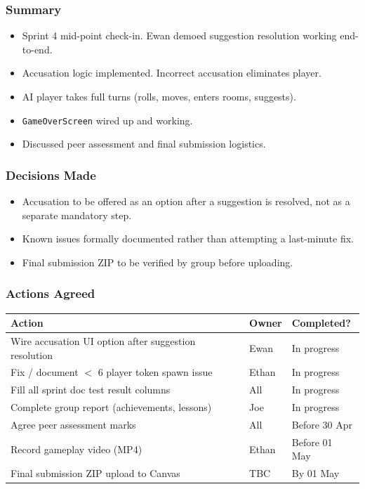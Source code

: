 \subsubsection*{Summary}
\begin{itemize}
    \item Sprint 4 mid-point check-in. Ewan demoed suggestion resolution working end-to-end.
    \item Accusation logic implemented. Incorrect accusation eliminates player.
    \item AI player takes full turns (rolls, moves, enters rooms, suggests).
    \item \texttt{GameOverScreen} wired up and working.
    \item Discussed peer assessment and final submission logistics.
\end{itemize}

\subsubsection*{Decisions Made}
\begin{itemize}
    \item Accusation to be offered as an option after a suggestion is resolved, not as a separate mandatory step.
    \item Known issues formally documented rather than attempting a last-minute fix.
    \item Final submission ZIP to be verified by group before uploading.
\end{itemize}

\subsubsection*{Actions Agreed}
\begin{table}[H]
\centering
\begin{tabular}{|p{8cm}|l|l|}
\hline
\textbf{Action} & \textbf{Owner} & \textbf{Completed?} \\ \hline
Wire accusation UI option after suggestion resolution & Ewan & In progress \\ \hline
Fix / document $<$ 6 player token spawn issue & Ethan & In progress \\ \hline
Fill all sprint doc test result columns & All & In progress \\ \hline
Complete group report (achievements, lessons) & Joe & In progress \\ \hline
Agree peer assessment marks & All & Before 30 Apr \\ \hline
Record gameplay video (MP4) & Ethan & Before 01 May\\ \hline
Final submission ZIP upload to Canvas & TBC & By 01 May\\ \hline
\end{tabular}
\end{table}

\newpage
